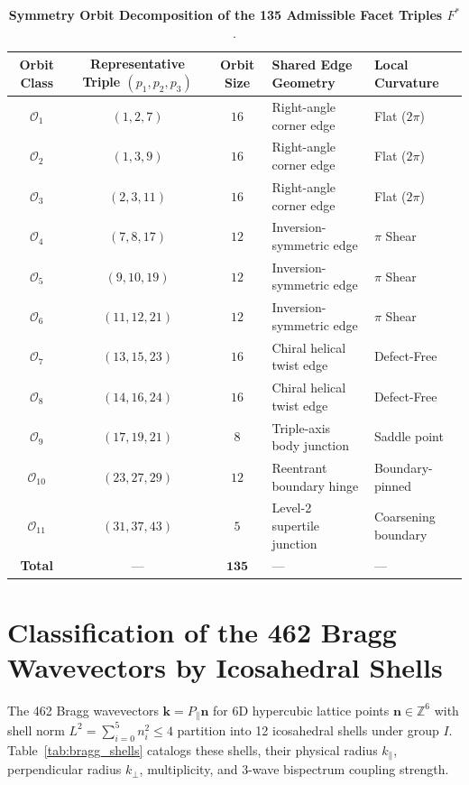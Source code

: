 \documentclass[11pt,a4paper]{article}
\theoremstyle{definition}
\newcommand{\Z}{\mathbb{Z}}
\begin{document}
\begin{table}[h!]
\centering
\small
\caption{\textbf{Symmetry Orbit Decomposition of the 135 Admissible Facet Triples $F^*$}.}
\label{tab:facet_triples_orbits}
\begin{tabularx}{\textwidth}{@{}cccp{4.5cm}p{2.8cm}@{}}
\toprule
\textbf{Orbit Class} & \textbf{Representative Triple $(p_1, p_2, p_3)$} & \textbf{Orbit Size} & \textbf{Shared Edge Geometry} & \textbf{Local Curvature} \\
\midrule
$\mathcal{O}_1$ & $(1, 2, 7)$ & $16$ & Right-angle corner edge & Flat ($2\pi$) \\
$\mathcal{O}_2$ & $(1, 3, 9)$ & $16$ & Right-angle corner edge & Flat ($2\pi$) \\
$\mathcal{O}_3$ & $(2, 3, 11)$ & $16$ & Right-angle corner edge & Flat ($2\pi$) \\
$\mathcal{O}_4$ & $(7, 8, 17)$ & $12$ & Inversion-symmetric edge & $\pi$ Shear \\
$\mathcal{O}_5$ & $(9, 10, 19)$ & $12$ & Inversion-symmetric edge & $\pi$ Shear \\
$\mathcal{O}_6$ & $(11, 12, 21)$ & $12$ & Inversion-symmetric edge & $\pi$ Shear \\
$\mathcal{O}_7$ & $(13, 15, 23)$ & $16$ & Chiral helical twist edge & Defect-Free \\
$\mathcal{O}_8$ & $(14, 16, 24)$ & $16$ & Chiral helical twist edge & Defect-Free \\
$\mathcal{O}_9$ & $(17, 19, 21)$ & $8$ & Triple-axis body junction & Saddle point \\
$\mathcal{O}_{10}$ & $(23, 27, 29)$ & $12$ & Reentrant boundary hinge & Boundary-pinned \\
$\mathcal{O}_{11}$ & $(31, 37, 43)$ & $5$ & Level-2 supertile junction & Coarsening boundary \\
\midrule
\textbf{Total} & --- & $\mathbf{135}$ & --- & --- \\
\bottomrule
\end{tabularx}
\end{table}

\section{Classification of the 462 Bragg Wavevectors by Icosahedral Shells}
\label{app:bragg_shells}

The 462 Bragg wavevectors $\mathbf{k} = P_\parallel \mathbf{n}$ for 6D hypercubic lattice points $\mathbf{n} \in \Z^6$ with shell norm $L^2 = \sum_{i=0}^5 n_i^2 \le 4$ partition into 12 icosahedral shells under group $I$. Table~\ref{tab:bragg_shells} catalogs these shells, their physical radius $k_\parallel$, perpendicular radius $k_\perp$, multiplicity, and 3-wave bispectrum coupling strength.
\end{document}
